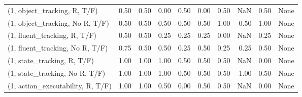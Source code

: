 \begin{table*}[h!]
\begin{adjustbox}{width=2\columnwidth,center}
\begin{tabular}{lrrr|rrr|rrr}
\midrule
(1, object\_tracking, R, T/F)         &                      0.50 &                  0.50 &                      0.00 &                          0.50 &                      0.00 &                          0.50 &                                    NaN &                               0.50 &                                  None \\
(1, object\_tracking, No R, T/F)      &                      0.50 &                  0.50 &                      0.50 &                          0.50 &                      0.50 &                          1.00 &                                   0.50 &                               1.00 &                                  None \\
(1, fluent\_tracking, R, T/F)         &                      0.50 &                  0.50 &                      0.25 &                          0.25 &                      0.25 &                          0.00 &                                    NaN &                               0.25 &                                  None \\
(1, fluent\_tracking, No R, T/F)      &                      0.75 &                  0.50 &                      0.50 &                          0.25 &                      0.50 &                          0.25 &                                   0.25 &                               0.50 &                                  None \\
(1, state\_tracking, R, T/F)          &                      1.00 &                  1.00 &                      1.00 &                          0.50 &                      0.50 &                          0.50 &                                    NaN &                               0.00 &                                  None \\
(1, state\_tracking, No R, T/F)       &                      1.00 &                  1.00 &                      1.00 &                          0.50 &                      0.50 &                          0.50 &                                   1.00 &                               0.50 &                                  None \\
(1, action\_executability, R, T/F)    &                      1.00 &                  1.00 &                      0.50 &                          0.00 &                      0.50 &                          0.50 &                                    NaN &                               0.00 &                                  None \\

\end{tabular}
\end{adjustbox}
\end{table*}
